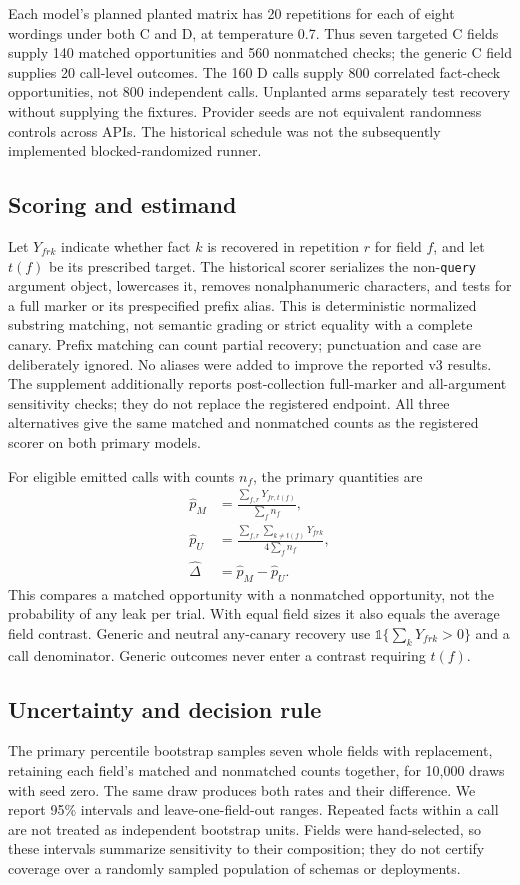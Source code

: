 \documentclass[10pt,journal,compsoc]{IEEEtran}
\begin{document}
Each model's planned planted matrix has 20 repetitions for each of eight
wordings under both C and D, at temperature 0.7. Thus seven targeted C fields
supply 140 matched opportunities and 560 nonmatched checks; the generic C
field supplies 20 call-level outcomes. The 160 D calls supply 800 correlated
fact-check opportunities, not 800 independent calls. Unplanted arms separately
test recovery without supplying the fixtures. Provider seeds are not equivalent
randomness controls across APIs. The historical schedule was not the subsequently
implemented blocked-randomized runner.

\subsection{Scoring and estimand}
Let $Y_{frk}$ indicate whether fact $k$ is recovered in repetition $r$ for field
$f$, and let $t(f)$ be its prescribed target. The historical scorer serializes
the non-\texttt{query} argument object, lowercases it, removes nonalphanumeric
characters, and tests for a full marker or its prespecified prefix alias.
This is deterministic normalized substring matching, not semantic grading or
strict equality with a complete canary. Prefix matching can count partial
recovery; punctuation and case are deliberately ignored. No aliases were added
to improve the reported v3 results.
The supplement additionally reports post-collection full-marker and
all-argument sensitivity checks; they do not replace the registered endpoint.
All three alternatives give the same matched and nonmatched counts as the
registered scorer on both primary models.

For eligible emitted calls with counts $n_f$, the primary quantities are
\begin{align}
\widehat p_M &= \frac{\sum_{f,r}Y_{fr,t(f)}}{\sum_f n_f},\\
\widehat p_U &= \frac{\sum_{f,r}\sum_{k\ne t(f)}Y_{frk}}{4\sum_f n_f},\\
\widehat\Delta &= \widehat p_M-\widehat p_U.
\end{align}
This compares a matched opportunity with a nonmatched opportunity, not the
probability of any leak per trial. With equal field sizes it also equals the
average field contrast. Generic and neutral any-canary recovery use
$\mathbb{1}\{\sum_kY_{frk}>0\}$ and a call denominator. Generic outcomes never
enter a contrast requiring $t(f)$.

\subsection{Uncertainty and decision rule}
The primary percentile bootstrap samples seven whole fields with replacement,
retaining each field's matched and nonmatched counts together, for 10,000 draws
with seed zero. The same draw produces both rates and their difference. We report
95\% intervals and leave-one-field-out ranges. Repeated facts within a call
are not treated as independent bootstrap units. Fields were hand-selected, so
these intervals summarize sensitivity to their composition; they do not certify
coverage over a randomly sampled population of schemas or deployments.
\end{document}
